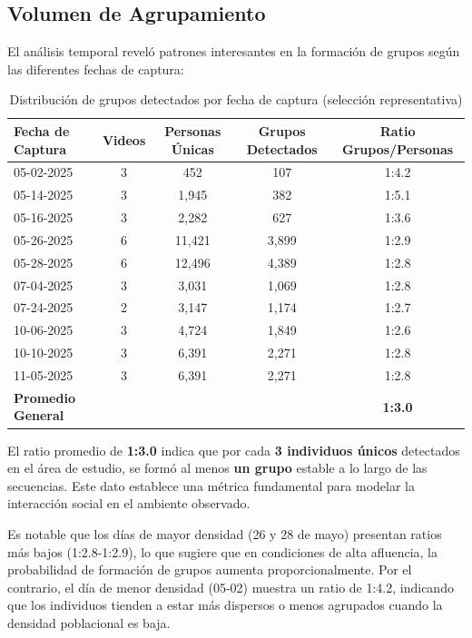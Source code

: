 \subsection{Volumen de Agrupamiento}
El análisis temporal reveló patrones interesantes en la formación de grupos según las diferentes fechas de captura:

\begin{table}[h]
	\centering
	\caption{Distribución de grupos detectados por fecha de captura (selección representativa)}
	\begin{tabular}{|l|c|c|c|c|}
		\hline
		\textbf{Fecha de Captura} & \textbf{Videos} & \textbf{Personas Únicas} & \textbf{Grupos Detectados} & \textbf{Ratio Grupos/Personas} \\
		\hline
		05-02-2025 & 3 & 452 & 107 & 1:4.2 \\
		05-14-2025 & 3 & 1,945 & 382 & 1:5.1 \\
		05-16-2025 & 3 & 2,282 & 627 & 1:3.6 \\
		05-26-2025 & 6 & 11,421 & 3,899 & 1:2.9 \\
		05-28-2025 & 6 & 12,496 & 4,389 & 1:2.8 \\
		07-04-2025 & 3 & 3,031 & 1,069 & 1:2.8 \\
		07-24-2025 & 2 & 3,147 & 1,174 & 1:2.7 \\
		10-06-2025 & 3 & 4,724 & 1,849 & 1:2.6 \\
		10-10-2025 & 3 & 6,391 & 2,271 & 1:2.8 \\
		11-05-2025 & 3 & 6,391 & 2,271 & 1:2.8 \\
		\hline
		\textbf{Promedio General} & & & & \textbf{1:3.0} \\
		\hline
	\end{tabular}
\end{table}

El ratio promedio de \textbf{1:3.0} indica que por cada \textbf{3 individuos únicos} detectados en el área de estudio, se formó al menos \textbf{un grupo} estable a lo largo de las secuencias. Este dato establece una métrica fundamental para modelar la interacción social en el ambiente observado.

Es notable que los días de mayor densidad (26 y 28 de mayo) presentan ratios más bajos (1:2.8-1:2.9), lo que sugiere que en condiciones de alta afluencia, la probabilidad de formación de grupos aumenta proporcionalmente. Por el contrario, el día de menor densidad (05-02) muestra un ratio de 1:4.2, indicando que los individuos tienden a estar más dispersos o menos agrupados cuando la densidad poblacional es baja.

